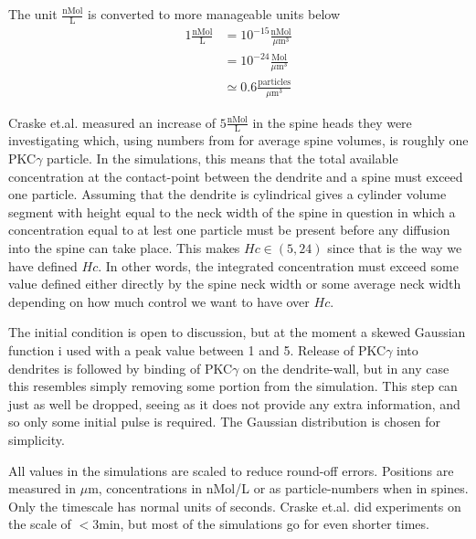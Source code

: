 The unit $\frac{\text{nMol}}{\text{L}}$ is converted to more manageable units below 
\begin{align*}
 1\frac{\text{nMol}}{\text{L}} &= 10^{-15}\frac{\text{nMol}}{\mu\text{m}^3}\\
 &= 10^{-24}\frac{\text{Mol}}{\mu\text{m}^3}\\
 &\simeq 0.6\frac{\text{particles}}{\mu\text{m}^3}
\end{align*}

Craske et.al. measured an increase of $5\frac{\text{nMol}}{\text{L}}$ in the spine heads they were investigating \cite{craske2005spines} which, using numbers from \cite{arellano2007ultrastructure} for average spine volumes, is roughly one PKC$\gamma$ particle. 
In the simulations, this means that the total available concentration at the contact-point between the dendrite and a spine must exceed one particle. 
Assuming that the dendrite is cylindrical gives a cylinder volume segment with height equal to the neck width of the spine in question in which a concentration equal to at lest one particle must be present before any diffusion into the spine can take place. 
This makes $Hc \in (5,24)$ since that is the way we have defined $Hc$. 
In other words, the integrated concentration must exceed some value defined either directly by the spine neck width or some average neck width depending on how much control we want to have over $Hc$.

The initial condition is open to discussion, but at the moment a skewed Gaussian function i used with a peak value between 1 and 5. 
Release of PKC$\gamma$ into dendrites is followed by binding of PKC$\gamma$ on the dendrite-wall, but in any case this resembles simply removing some portion from the simulation. 
This step can just as well be dropped, seeing as it does not provide any extra information, and so only some initial pulse is required. 
The Gaussian distribution is chosen for simplicity. 

All values in the simulations are scaled to reduce round-off errors. 
Positions are measured in $\mu$m, concentrations in nMol/L or as particle-numbers when in spines. Only the timescale has normal units of seconds. 
Craske et.al. did experiments on the scale of $<3$min, but most of the simulations go for even shorter times.